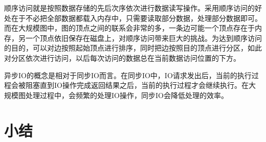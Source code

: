顺序访问就是按照数据存储的先后次序依次进行数据读写操作。采用顺序访问的好处在于不必把全部数据都载入内存中，只需要读取部分数据，处理部分数据即可。而在大规模图中，图的顶点之间的联系会非常的多，一条边可能一个顶点存在于内存，另一个顶点依旧保存在磁盘上，对顺序访问带来巨大的挑战。为达到顺序访问的目的，可以对边按照起始顶点进行排序，同时把边按照目的顶点进行分区，如此对分区依次进行访问，以后每次访问的数据总在当前数据访问位置的下方。

异步IO的概念是相对于同步IO而言。在同步IO中，IO请求发出后，当前的执行过程会被阻塞直到IO操作完成返回结果之后，当前的执行过程才会继续执行。在大规模图处理过程中，会频繁的处理IO操作，同步IO会降低处理的效率。

\section{小结}